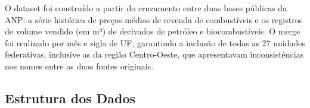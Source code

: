 \documentclass[11pt, a4paper, oneside]{article}
\begin{document}
\vspace{6mm}

O dataset foi construído a partir do cruzamento entre duas bases públicas da ANP: a
série histórica de preços médios de revenda de combustíveis e os registros de volume
vendido (em m³) de derivados de petróleo e biocombustíveis. O merge foi realizado por
mês e sigla de UF, garantindo a inclusão de todas as 27 unidades federativas,
inclusive as da região Centro-Oeste, que apresentavam inconsistências nos nomes entre
as duas fontes originais.

\subsection{Estrutura dos Dados}
\label{sec:dataset-estrutura}
\end{document}
